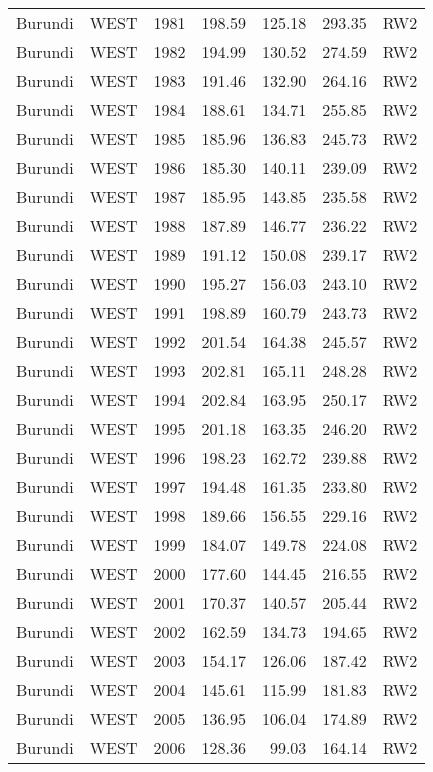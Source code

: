 \begin{longtable}{lllrrrl}
  Burundi & WEST & 1981 & 198.59 & 125.18 & 293.35 & RW2 \\ 
  Burundi & WEST & 1982 & 194.99 & 130.52 & 274.59 & RW2 \\ 
  Burundi & WEST & 1983 & 191.46 & 132.90 & 264.16 & RW2 \\ 
  Burundi & WEST & 1984 & 188.61 & 134.71 & 255.85 & RW2 \\ 
  Burundi & WEST & 1985 & 185.96 & 136.83 & 245.73 & RW2 \\ 
  Burundi & WEST & 1986 & 185.30 & 140.11 & 239.09 & RW2 \\ 
  Burundi & WEST & 1987 & 185.95 & 143.85 & 235.58 & RW2 \\ 
  Burundi & WEST & 1988 & 187.89 & 146.77 & 236.22 & RW2 \\ 
  Burundi & WEST & 1989 & 191.12 & 150.08 & 239.17 & RW2 \\ 
  Burundi & WEST & 1990 & 195.27 & 156.03 & 243.10 & RW2 \\ 
  Burundi & WEST & 1991 & 198.89 & 160.79 & 243.73 & RW2 \\ 
  Burundi & WEST & 1992 & 201.54 & 164.38 & 245.57 & RW2 \\ 
  Burundi & WEST & 1993 & 202.81 & 165.11 & 248.28 & RW2 \\ 
  Burundi & WEST & 1994 & 202.84 & 163.95 & 250.17 & RW2 \\ 
  Burundi & WEST & 1995 & 201.18 & 163.35 & 246.20 & RW2 \\ 
  Burundi & WEST & 1996 & 198.23 & 162.72 & 239.88 & RW2 \\ 
  Burundi & WEST & 1997 & 194.48 & 161.35 & 233.80 & RW2 \\ 
  Burundi & WEST & 1998 & 189.66 & 156.55 & 229.16 & RW2 \\ 
  Burundi & WEST & 1999 & 184.07 & 149.78 & 224.08 & RW2 \\ 
  Burundi & WEST & 2000 & 177.60 & 144.45 & 216.55 & RW2 \\ 
  Burundi & WEST & 2001 & 170.37 & 140.57 & 205.44 & RW2 \\ 
  Burundi & WEST & 2002 & 162.59 & 134.73 & 194.65 & RW2 \\ 
  Burundi & WEST & 2003 & 154.17 & 126.06 & 187.42 & RW2 \\ 
  Burundi & WEST & 2004 & 145.61 & 115.99 & 181.83 & RW2 \\ 
  Burundi & WEST & 2005 & 136.95 & 106.04 & 174.89 & RW2 \\ 
  Burundi & WEST & 2006 & 128.36 & 99.03 & 164.14 & RW2 \\ 

\end{longtable}
